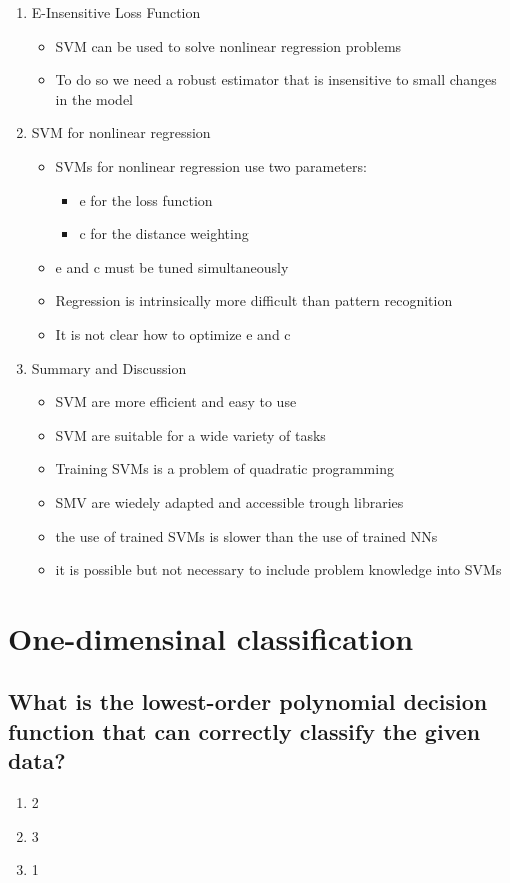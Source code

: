 \documentclass{scrartcl}
\begin{document}
\begin{enumerate}
\item E-Insensitive Loss Function
	\begin{itemize}
	\item SVM can be used to solve nonlinear regression problems
	\item To do so we need a robust estimator that is insensitive to small changes in the model
	\end{itemize}


\item SVM for nonlinear regression 
	\begin{itemize}
	\item SVMs for nonlinear regression use two parameters:
		\begin{itemize}
		\item e for the loss function
		\item c for the distance weighting
		\end{itemize}
	\item e and c must be tuned simultaneously
	\item Regression is intrinsically more difficult than pattern recognition
	\item It is not clear how to optimize e and c
	\end{itemize}


\item Summary and Discussion
	\begin{itemize}
	\item SVM are more efficient and easy to use
	\item SVM are suitable for a wide variety of tasks
	\item Training SVMs is a problem of quadratic programming
	\item SMV are wiedely adapted and accessible trough libraries
	\item the use of trained SVMs is slower than the use of trained NNs
	\item it is possible but not necessary to include problem knowledge into SVMs
	\end{itemize}


\end{enumerate}


\section{One-dimensinal classification}
\subsection{What is the lowest-order polynomial decision function that can correctly classify the
given data? 
}
\begin{enumerate}[label=(\alph*)]
\item 2
\item 3
\item 1
\end{enumerate}
\end{document}
